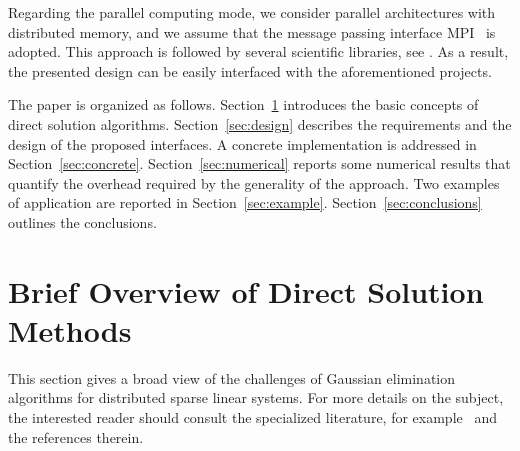 \documentclass[acmtoms,acmnow]{acmtrans2m}
\begin{document}
%
%
Regarding the parallel computing mode, we consider parallel
architectures with distributed memory, and we assume that the
message passing interface MPI~\cite{gropp98mpi} is adopted. This
approach is followed by several scientific libraries, see
\cite{heroux05trilinos,petsc-user-ref,falgout02hypre}. As a result,
the presented design can be easily interfaced with the
aforementioned projects.

\smallskip

The paper is organized as follows. Section~\ref{sec:overview} introduces the
basic concepts of direct solution algorithms. Section~\ref{sec:design}
describes the requirements and the design of the proposed
interfaces. A concrete implementation is addressed in
Section~\ref{sec:concrete}. Section~\ref{sec:numerical} reports some
numerical results that quantify the overhead required by the generality of
the approach. Two
examples of application are reported in Section~\ref{sec:example}.
Section~\ref{sec:conclusions} outlines the conclusions.

\section{Brief Overview of Direct Solution Methods}
\label{sec:overview}

This section gives a broad view of the challenges of Gaussian
elimination algorithms for distributed sparse linear systems. For
more details on the subject, the interested reader should consult
the specialized literature, for
example~\cite{duff86direct,duff97sparse} and the references therein.
\end{document}
